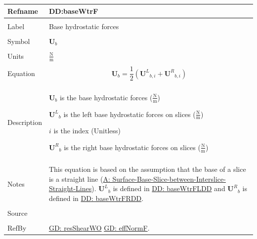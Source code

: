 \documentclass[12pt]{article}
\begin{document}
\noindent \begin{minipage}{\textwidth}
\begin{tabular}{p{} p{}}
\toprule \textbf{Refname} & \textbf{DD:baseWtrF}
\label{DD:baseWtrF}
\\ \midrule \\
Label & Base hydrostatic forces
\\ \midrule \\
Symbol & ${\mathbf{U}_{b}}$
\\ \midrule \\
Units & $\frac{\text{N}}{\text{m}}$
\\ \midrule \\
Equation & \begin{displaymath}
           {\mathbf{U}_{b}}=\frac{1}{2} \left({{\mathbf{U}^{L}}_{b,i}}+{{\mathbf{U}^{R}}_{b,i}}\right)
           \end{displaymath}
\\ \midrule \\
Description & \begin{symbDescription}
              \item{${\mathbf{U}_{b}}$ is the base hydrostatic forces ($\frac{\text{N}}{\text{m}}$)}
              \item{${{\mathbf{U}^{L}}_{b}}$ is the left base hydrostatic forces on slices ($\frac{\text{N}}{\text{m}}$)}
              \item{$i$ is the index (Unitless)}
              \item{${{\mathbf{U}^{R}}_{b}}$ is the right base hydrostatic forces on slices ($\frac{\text{N}}{\text{m}}$)}
              \end{symbDescription}
\\ \midrule \\
Notes & This equation is based on the assumption that the base of a slice is a straight line (\hyperref[assumpSBSBISL]{A: Surface-Base-Slice-between-Interslice-Straight-Lines}). ${{\mathbf{U}^{L}}_{b}}$ is defined in \hyperref[DD:baseWtrFLDD]{DD: baseWtrFLDD} and ${{\mathbf{U}^{R}}_{b}}$ is defined in \hyperref[DD:baseWtrFRDD]{DD: baseWtrFRDD}.
\\ \midrule \\
Source & \cite{fredlund1977}
\\ \midrule \\
RefBy & \hyperref[GD:resShearWO]{GD: resShearWO} \hyperref[GD:effNormF]{GD: effNormF}.
\\ \bottomrule \end{tabular}
\end{minipage}
\par~
\end{document}
